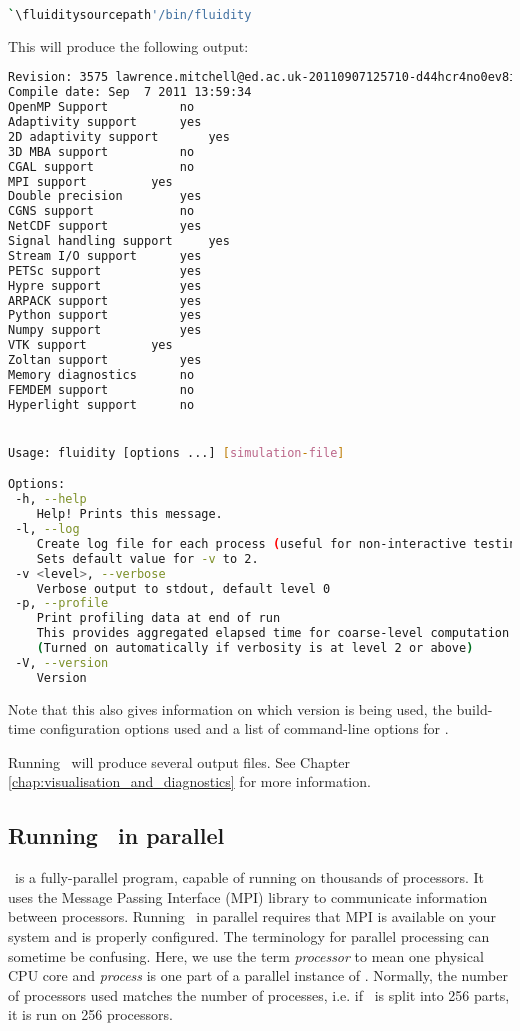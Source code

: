 \begin{lstlisting}[language=bash]
`\fluiditysourcepath'/bin/fluidity
\end{lstlisting}

This will produce the following output:

\begin{lstlisting}[language=Bash]
Revision: 3575 lawrence.mitchell@ed.ac.uk-20110907125710-d44hcr4no0ev8icc
Compile date: Sep  7 2011 13:59:34
OpenMP Support			no
Adaptivity support		yes
2D adaptivity support		yes
3D MBA support			no
CGAL support			no
MPI support			yes
Double precision		yes
CGNS support			no
NetCDF support			yes
Signal handling support		yes
Stream I/O support		yes
PETSc support			yes
Hypre support			yes
ARPACK support			yes
Python support			yes
Numpy support			yes
VTK support			yes
Zoltan support			yes
Memory diagnostics		no
FEMDEM support			no
Hyperlight support		no


Usage: fluidity [options ...] [simulation-file]

Options:
 -h, --help
    Help! Prints this message.
 -l, --log
    Create log file for each process (useful for non-interactive testing).
    Sets default value for -v to 2.
 -v <level>, --verbose
    Verbose output to stdout, default level 0
 -p, --profile
    Print profiling data at end of run
    This provides aggregated elapsed time for coarse-level computation
    (Turned on automatically if verbosity is at level 2 or above)
 -V, --version
    Version
\end{lstlisting}

Note that this also gives information on which version is being used, the
build-time configuration options used and a list of command-line options for
\fluidity. 

Running \fluidity\ will produce several output files. See Chapter \ref{chap:visualisation_and_diagnostics}
for more information.

\subsection{Running \fluidity\ in parallel}
\label{sec:running_fluidity_in_parallel}

\fluidity\ is a fully-parallel program, capable of running on thousands of
processors.  It uses the Message Passing Interface (MPI) library to communicate
information between processors. Running \fluidity\ in parallel requires that
MPI is available on your system and is properly configured. The terminology for
parallel processing can sometime be confusing.  Here, we use the term
\emph{processor} to mean one physical CPU core and \emph{process} is one part
of a parallel instance of \fluidity. Normally, the number of processors used
matches the number of processes, i.e. if \fluidity\ is split into 256 parts, it
is run on 256 processors.

